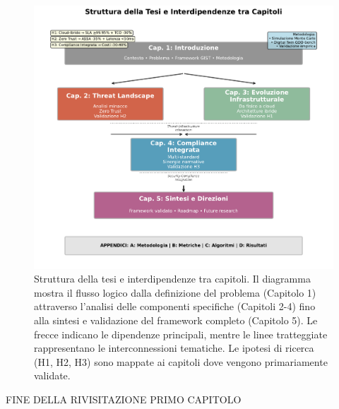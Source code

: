 \begin{figure}[htbp]
\centering
\includegraphics[width=1\textwidth]{thesis_figures/cap1/fig_1_4_thesis_structure.pdf}
\caption{Struttura della tesi e interdipendenze tra capitoli. Il diagramma mostra il flusso logico dalla definizione del problema (Capitolo 1) attraverso l'analisi delle componenti specifiche (Capitoli 2-4) fino alla sintesi e validazione del framework completo (Capitolo 5). Le frecce indicano le dipendenze principali, mentre le linee tratteggiate rappresentano le interconnessioni tematiche. Le ipotesi di ricerca (H1, H2, H3) sono mappate ai capitoli dove vengono primariamente validate.}
\label{fig:thesis_structure}
\end{figure}


FINE DELLA RIVISITAZIONE PRIMO CAPITOLO 
\clearpage
\printbibliography[
    heading=subbibliography, %
    title={Riferimenti Bibliografici del Capitolo 1}, %
]

\endrefsection %












